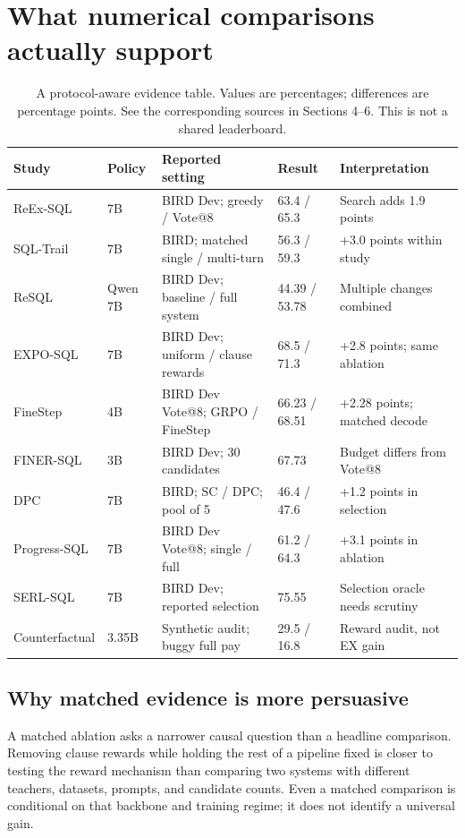 \documentclass[11pt,a4paper]{article}
\begin{document}
\section{What numerical comparisons actually support}
\begin{table}[h]
\centering\small
\begin{tabularx}{\textwidth}{@{}p{25mm}p{20mm}p{26mm}p{22mm}Y@{}}
\toprule
Study & Policy & Reported setting & Result & Interpretation\\
\midrule
ReEx-SQL & 7B & BIRD Dev; greedy / Vote@8 & 63.4 / 65.3 & Search adds 1.9 points\\
SQL-Trail & 7B & BIRD; matched single / multi-turn & 56.3 / 59.3 & +3.0 points within study\\
ReSQL & Qwen 7B & BIRD Dev; baseline / full system & 44.39 / 53.78 & Multiple changes combined\\
EXPO-SQL & 7B & BIRD Dev; uniform / clause rewards & 68.5 / 71.3 & +2.8 points; same ablation\\
FineStep & 4B & BIRD Dev Vote@8; GRPO / FineStep & 66.23 / 68.51 & +2.28 points; matched decode\\
FINER-SQL & 3B & BIRD Dev; 30 candidates & 67.73 & Budget differs from Vote@8\\
DPC & 7B & BIRD; SC / DPC; pool of 5 & 46.4 / 47.6 & +1.2 points in selection\\
Progress-SQL & 7B & BIRD Dev Vote@8; single / full & 61.2 / 64.3 & +3.1 points in ablation\\
SERL-SQL & 7B & BIRD Dev; reported selection & 75.55 & Selection oracle needs scrutiny\\
Counterfactual & 3.35B & Synthetic audit; buggy full pay & 29.5 / 16.8 & Reward audit, not EX gain\\
\bottomrule
\end{tabularx}
\caption{A protocol-aware evidence table. Values are percentages; differences are percentage points. See the corresponding sources in Sections 4--6. This is not a shared leaderboard.}
\end{table}

\subsection{Why matched evidence is more persuasive}
A matched ablation asks a narrower causal question than a headline comparison. Removing clause rewards while holding the rest of a pipeline fixed is closer to testing the reward mechanism than comparing two systems with different teachers, datasets, prompts, and candidate counts. Even a matched comparison is conditional on that backbone and training regime; it does not identify a universal gain.
\end{document}
